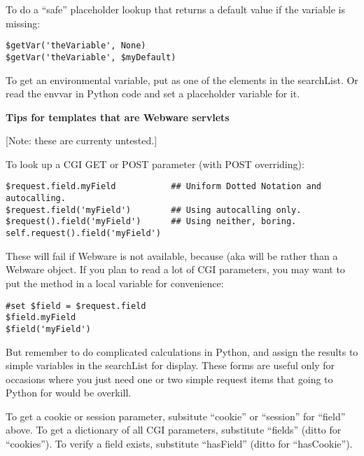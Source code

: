 To do a ``safe'' placeholder lookup that returns a default value if the
variable is missing:
\begin{verbatim}
$getVar('theVariable', None)
$getVar('theVariable', $myDefault)
\end{verbatim}

To get an environmental variable, put  as one of the
elements in the searchList.  Or read the envvar in Python code and set a
placeholder variable for it.

{\bf Tips for templates that are Webware servlets}

[Note: these are currenty untested.]

To look up a CGI GET or POST parameter (with POST overriding):
\begin{verbatim}
$request.field.myField           ## Uniform Dotted Notation and autocalling.
$request.field('myField')        ## Using autocalling only.
$request().field('myField')      ## Using neither, boring.
self.request().field('myField')
\end{verbatim}
These will fail if Webware is not available, because 
(aka  will be  rather than a Webware
 object.  If you plan to read a lot of CGI parameters,
you may want to put the  method in a local variable for
convenience:
\begin{verbatim}
#set $field = $request.field
$field.myField
$field('myField')
\end{verbatim}
But remember to do complicated calculations in Python, and assign the results
to simple variables in the searchList for display.  These 
forms are useful only for occasions where you just need one or two simple
request items that going to Python for would be overkill.

To get a cookie or session parameter, subsitute ``cookie'' or ``session'' for
``field'' above.  To get a dictionary of all CGI parameters, substitute
``fields'' (ditto for ``cookies'').  To verify a field exists,
substitute ``hasField'' (ditto for ``hasCookie'').  

